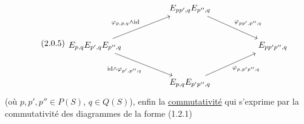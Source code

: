 \begin{equation}\tag{2.0.5}
\begin{tikzcd}[column sep=huge, row sep=large]
 & E_{pp',q}E_{p'',q} \arrow[rd, "{\varphi_{pp',p'';q}}"] & \\
E_{p,q}E_{p',q}E_{p'',q} \arrow[ru, "{\varphi_{p,p;q}\wedge \mathrm{id}}"] \arrow[rd, "{\mathrm{id}\wedge\varphi_{p',p'';q}}"'] & & E_{pp'p'',q} \\
 & E_{p,q}E_{p'p'',q} \arrow[ru, "{\varphi_{p,p'p'';q}}"'] &
\end{tikzcd}
\end{equation}
(où $p,p',p'' \in P(S)$, $q \in Q(S)$), enfin la \underline{commutativité} qui s'exprime par la commutativité des diagrammes de la forme (1.2.1) 



